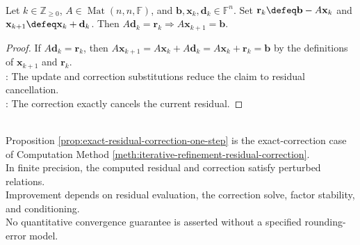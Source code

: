 \begin{proposition} \label{prop:exact-residual-correction-one-step} \\
Let $k\in\mathbb{Z}_{\geq0}$, $A\in\operatorname{Mat}(n,n,\mathbb{F})$, and $\mathbf{b},\mathbf{x}_k,\mathbf{d}_k\in\mathbb{F}^n$. Set $\mathbf{r}_k\defeq\mathbf{b}-A\mathbf{x}_k$ and $\mathbf{x}_{k+1}\defeq\mathbf{x}_k+\mathbf{d}_k$. Then $A\mathbf{d}_k=\mathbf{r}_k\Rightarrow A\mathbf{x}_{k+1}=\mathbf{b}$.
\begin{proof}
If $A\mathbf{d}_k=\mathbf{r}_k$, then $A\mathbf{x}_{k+1}=A\mathbf{x}_k+A\mathbf{d}_k=A\mathbf{x}_k+\mathbf{r}_k=\mathbf{b}$ by the definitions of $\mathbf{x}_{k+1}$ and $\mathbf{r}_k$.\\
: The update and correction substitutions reduce the claim to residual cancellation.\\
: The correction exactly cancels the current residual.
\end{proof}
\end{proposition}

\begin{perspective} \label{per:finite-precision-iterative-refinement} \\
Proposition \ref{prop:exact-residual-correction-one-step} is the exact-correction case of Computation Method \ref{meth:iterative-refinement-residual-correction}.\\
In finite precision, the computed residual and correction satisfy perturbed relations.\\
Improvement depends on residual evaluation, the correction solve, factor stability, and conditioning.\\
No quantitative convergence guarantee is asserted without a specified rounding-error model.
\end{perspective}
